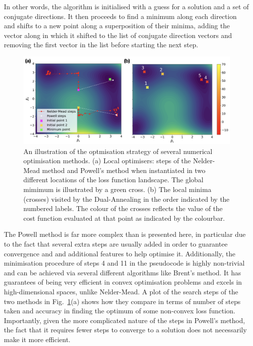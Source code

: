 In other words, the algorithm is initialised with a guess for a solution and a set of conjugate directions. It then proceeds to find a minimum along each direction and shifts to a new point along a superposition of their minima, adding the vector along in which it shifted to the list of conjugate direction vectors and removing the first vector in the list before starting the next step.

\begin{figure}[t]
\centering
\includegraphics[width=\linewidth]{images/optimiser_plots.png} \caption[Visualising optimisers in action]{An illustration of the optmisation strategy of several numerical optimisation methods. (a) Local optimisers: steps of the Nelder-Mead method and Powell's method when instantiated in two different locations of the loss function landscape. The global mimimum is illustrated by a green cross. (b) The local minima (crosses) visited by the Dual-Annealing in the order indicated by the numbered labels. The colour of the crosses reflects the value of the cost function evaluated at that point as indicated by the colourbar.}\label{fig:optimisers}
\end{figure}

The Powell method is far more complex than is presented here, in particular due to the fact that several extra steps are usually added in order to guarantee convergence and and additional features to help optimise it. Additionally, the minimisation procedure of steps 4 and 11 in the pseudocode is highly non-trivial and can be achieved via several different algorithms like Brent's method\cite{brent_algorithms_2002}. It has guarantees of being very efficient in convex optimisation problems and excels in high-dimensional spaces, unlike Nelder-Mead. A plot of the search steps of the two methods in Fig.~\ref{fig:optimisers}(a) shows how they compare in terms of number of steps taken and accuracy in finding the optimum of some non-convex loss function. Importantly, given the more complicated nature of the steps in Powell's method, the fact that it requires fewer steps to converge to a solution does not necessarily make it more efficient.

